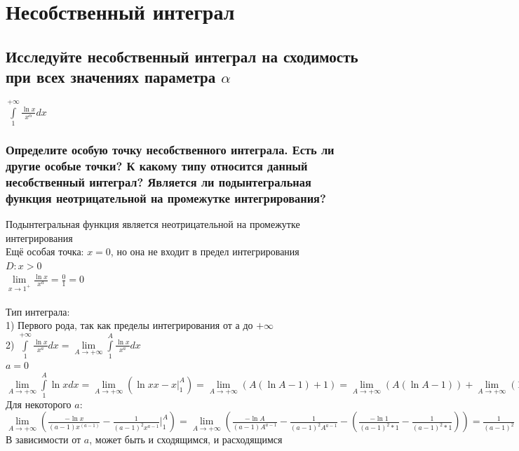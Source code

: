 \documentclass{article}
\begin{document}
\section{Несобственный интеграл}
\normalsize
\subsection{Исследуйте несобственный интеграл на сходимость при всех значениях параметра $ \alpha $}
\large $ \int\limits^{+\infty}_{1} \frac{\ln{x}}{x^{\alpha}}dx $\\
\normalsize
\subsubsection{Определите особую точку несобственного интеграла. Есть ли другие особые точки? К какому типу относится данный несобственный интеграл? Является ли подынтегральная функция неотрицательной на промежутке интегрирования?}
Подынтегральная функция является неотрицательной на промежутке интегрирования\\
Ещё особая точка: $ x = 0 $, но она не входит в предел интегрирования\\
$ D: x > 0 $\\
$ \lim\limits_{x\to 1^{+}} \frac{\ln{x}}{x^a} = \frac{0}{1} = 0 $\\\\
Тип интеграла:\\
1) Первого рода, так как пределы интегрирования от $ а $ до $ +\infty $\\
2) $ \int\limits^{+\infty}_{1} \frac{\ln{x}}{x^a}dx = \lim\limits_{A\to +\infty} \int\limits^A_1 \frac{\ln{x}}{x^a}dx $\\
$ a = 0 $\\
$ \lim\limits_{A\to +\infty} \int\limits^A_1 \ln{x}dx = \lim\limits_{A\to +\infty}(\ln{x}x - x |^A_1) = \lim\limits_{A \to +\infty} (A (\ln{A-1}) + 1) = \lim\limits_{A \to +\infty} (A (\ln{A - 1})) + \lim\limits_{A \to +\infty} (1) = \lim\limits_{A \to +\infty} (A) * \lim\limits_{A \to +\infty} (\ln{A - 1}) + 1 = +\infty $\\
Для некоторого $ a $:\\
$ \lim\limits_{A\to +\infty} (\frac{-\ln{x}}{(a-1)x^{(a-1)}} - \frac{1}{(a-1)^2 x^{a-1}} |^A_1) = \lim\limits_{A\to +\infty} (\frac{-\ln{A}}{(a-1)A^{a-1}} - \frac{1}{(a-1)^2 A^{a-1}} - (\frac{-\ln{1}}{(a-1)^2 * 1} - \frac{1}{(a-1)^2 * 1})) = \frac{1}{(a-1)^2} $\\
В зависимости от $ a $, может быть и сходящимся, и расходящимся
\end{document}
